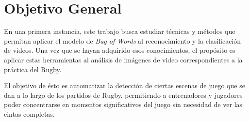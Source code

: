 \section{Objetivo General}
\iffalse
Explique el problema o situación de referencia en el que se desarrolla la
propuesta o los interrogantes en el campo disciplinario a los que la propuesta se
dirige. Desarrolle la importancia e impacto de los objetivos y el conocimiento
que se generará. En esta sección no es necesario describir las tareas específicas
que se realizarán (para eso, ver Objetivos específicos).
\fi
En una primera instancia, este trabajo busca estudiar técnicas y métodos que permitan aplicar el modelo de \textit{Bag of Words}
al reconocimiento y la clasificación de videos. 
Una vez que se hayan adquirido esos conocimientos, el propósito es aplicar estas herramientas al análisis de imágenes de video correspondientes a la
práctica del Rugby.

El objetivo de ésto es automatizar la detección de ciertas escenas de juego que se dan a lo largo de los partidos de Rugby, permitiendo a entrenadores
y jugadores poder concentrarse en momentos significativos del juego sin necesidad de ver las cintas completas.